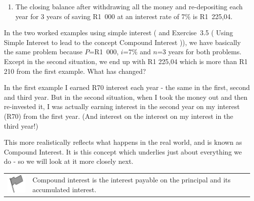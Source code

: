 {\begin{mdframed}[linewidth=4, leftmargin=40, rightmargin=40]
\begin{exercise}
\begin{enumerate}[noitemsep, label=\textbf{Step} \textbf{\arabic*}. ]
      
      \item  
      \label{m39334*id72567}The closing balance after withdrawing all the money and re-depositing each year for 3 years of saving R1~000 at an interest rate of 7\% is R1~225,04. \par 
      \end{enumerate}
         

    \end{exercise}
    \end{mdframed}
    }
    \noindent
  
      \label{m39334*id72585}In the two worked examples using simple interest ( and Exercise~3.5 ( Using Simple Interest to lead to the concept Compound Interest )), we have basically the same problem because \begin{math}P\end{math}=R1~000, \begin{math}i\end{math}=7\% and \begin{math}n\end{math}=3 years for both problems. Except in the second situation, we end up with R1 225,04 which is more than R1 210 from the first example. What has changed?\par 
      \label{m39334*id72618}In the first example I earned R70 interest each year - the same in the first, second and third year. But in the second situation, when I took the money out and then re-invested it, I was actually earning interest in the second year on my interest (R70) from the first year. (And interest on the interest on my interest in the third year!)\par 
      \label{m39334*id72624}This more realistically reflects what happens in the real world, and is known as Compound Interest. It is this concept which underlies just about everything we do - so we will look at it more closely next.\par 
\label{m39334*fhsst!!!underscore!!!id2023}\begin{definition}
	  \begin{tabular*}{15 cm}{m{15 mm}m{}}
	\hspace*{-50pt}  \includegraphics[width=0.5in]{col11306.imgs/psflag2.png}   & \Definition{   \label{id2481335}\textbf{ Compound Interest }} { \label{m39334*meaningfhsst!!!underscore!!!id2023}
      \label{m39334*id72635}Compound interest is the interest payable on the principal and its accumulated interest. \par 
       } 
      \end{tabular*}
      \end{definition}

